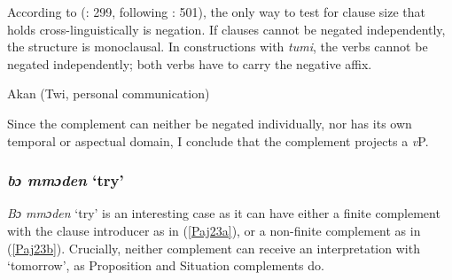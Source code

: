 \documentclass[output=paper]{langscibook}
\begin{document}
According to \citeauthor{haspelmath2016} (\citeyear{haspelmath2016}: 299, following \citealt{bohnemeyernodate}: 501), the only way to test for clause size that holds cross-linguistically is negation. If clauses cannot be negated independently, the structure is monoclausal. In constructions with \emph{tumi}, the verbs cannot be negated independently; both verbs have to carry the negative affix. 

\begin{exe}
\ex \label{Paj20} Akan (Twi, personal communication)
\begin{xlist}




\end{xlist}
\end{exe}

Since the complement can neither be negated individually, nor has its own temporal or aspectual domain, I conclude that the complement projects a \emph{v}P. 

\subsubsection{\textit{b{ɔ} mm{ɔ}den} `try'}

\emph{Bɔ mmɔden} ‘try’ is an interesting case as it can have either a finite complement with the clause introducer as in (\ref{Paj23a}), or a non-finite complement as in (\ref{Paj23b}). Crucially, neither complement can receive an interpretation with ‘tomorrow’, as Proposition and Situation complements do.
\end{document}
